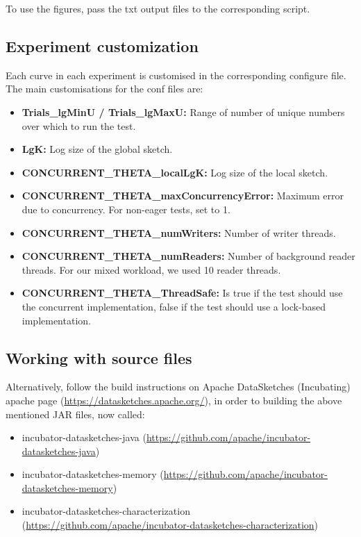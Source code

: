 {To use the figures, pass the txt output files to the corresponding script.


\subsection{Experiment customization}

Each curve in each experiment is customised in the corresponding configure file.
The main customisations for the conf files are:
\begin{itemize}
  \item \textbf{Trials\_lgMinU / Trials\_lgMaxU:} Range of number of unique numbers over which to run the test.
  \item \textbf{LgK:} Log size of the global sketch.
  \item \textbf{CONCURRENT\_THETA\_localLgK:} Log size of the local sketch.
  \item \textbf{CONCURRENT\_THETA\_maxConcurrencyError:} Maximum error due to concurrency. For non-eager tests, set to 1.
  \item \textbf{CONCURRENT\_THETA\_numWriters:} Number of writer threads.
  \item \textbf{CONCURRENT\_THETA\_numReaders:} Number of background reader threads. For our mixed workload, we used 10 reader threads.  
  \item \textbf{CONCURRENT\_THETA\_ThreadSafe:} Is true if the test should use the concurrent implementation,
  false if the test should use a lock-based implementation.
\end{itemize}

\subsection{Working with source files}

Alternatively, follow the build instructions on Apache DataSketches (Incubating) apache
page (\url{https://datasketches.apache.org/}), in order to building the above mentioned
JAR files, now called:
\begin{itemize}
  \item incubator-datasketches-java (\url{https://github.com/apache/incubator-datasketches-java})
  \item incubator-datasketches-memory (\url{https://github.com/apache/incubator-datasketches-memory})
  \item incubator-datasketches-characterization (\url{https://github.com/apache/incubator-datasketches-characterization})
\end{itemize}

}
